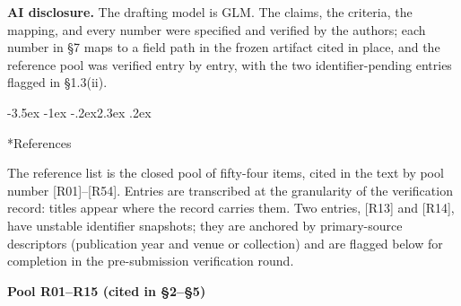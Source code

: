 \documentclass[11pt,a4paper]{article}
\makeatletter
\renewcommand\section{\@startsection{section}{1}{\z@}%
  {-3.5ex \@plus -1ex \@minus -.2ex}{2.3ex \@plus .2ex}%
  {\normalfont\Large\bfseries\raggedright}}
\makeatother
\begin{document}
\textbf{AI disclosure.} The drafting model is GLM. The claims, the criteria, the mapping, and every number were specified and verified by the authors; each number in §7 maps to a field path in the frozen artifact cited in place, and the reference pool was verified entry by entry, with the two identifier-pending entries flagged in §1.3(ii).

\section*{References}

The reference list is the closed pool of fifty-four items, cited in the text by pool number [R01]–[R54]. Entries are transcribed at the granularity of the verification record: titles appear where the record carries them. Two entries, [R13] and [R14], have unstable identifier snapshots; they are anchored by primary-source descriptors (publication year and venue or collection) and are flagged below for completion in the pre-submission verification round.

\medskip
\noindent\textbf{Pool R01–R15 (cited in §2–§5)}\par\addvspace{2pt}
\end{document}
